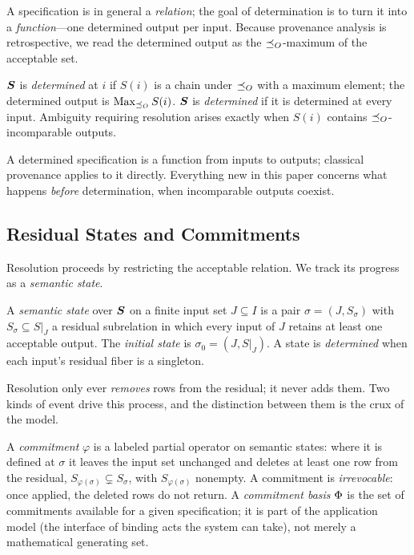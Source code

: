 A specification is in general a \emph{relation}; the goal of determination is
to turn it into a \emph{function}---one determined output per input. Because
provenance analysis is retrospective, we read the determined output as the
$\preceq_O$-maximum of the acceptable set.

\begin{definition}[Determined]
  \label{def:determined}
  $\boldsymbol{S}$ is \emph{determined} at $i$ if $S(i)$ is a chain under $\preceq_O$ with
  a maximum element; the determined output is $\operatorname{Max}_{\preceq_O} S(i)$. $\boldsymbol{S}$ is
  \emph{determined} if it is determined at every input. Ambiguity requiring
  resolution arises exactly when $S(i)$ contains $\preceq_O$-incomparable outputs.
\end{definition}

\noindent
A determined specification is a function from inputs to outputs; classical
provenance applies to it directly. Everything new in this paper concerns what
happens \emph{before} determination, when incomparable outputs coexist.

\subsection{Residual States and Commitments}

Resolution proceeds by restricting the acceptable relation. We track its
progress as a \emph{semantic state}.

\begin{definition}
  \label{def:state}
  A \emph{semantic state} over $\boldsymbol{S}$ on a finite input set $J \subseteq I$
  is a pair $\sigma = (J, S_\sigma)$ with $S_\sigma \subseteq S|_J$ a residual
  subrelation in which every input of $J$ retains at least one acceptable
  output. The \emph{initial state} is $\sigma_0 = (J, S|_J)$. A state is
  \emph{determined} when each input's residual fiber is a singleton.
\end{definition}

\noindent
Resolution only ever \emph{removes} rows from the residual; it never adds
them. Two kinds of event drive this process, and the distinction between them
is the crux of the model.

\begin{definition}
  \label{def:commitment}
  A \emph{commitment} $\varphi$ is a labeled partial operator on semantic
  states: where it is defined at $\sigma$ it leaves the input set unchanged
  and deletes at least one row from the residual,
  $S_{\varphi(\sigma)} \subsetneq S_\sigma$, with $S_{\varphi(\sigma)}$
  nonempty. A commitment is \emph{irrevocable}: once applied, the deleted rows
  do not return. A \emph{commitment basis} $\Phi$ is the set of commitments
  available for a given specification; it is part of the application model
  (the interface of binding acts the system can take), not merely a
  mathematical generating set.
\end{definition}

